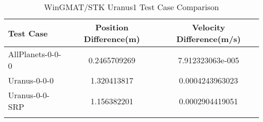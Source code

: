 \begin{table}[htbp!]
\centering
\caption{ WinGMAT/STK Uranus1 Test Case Comparison}
      \begin{tabular}{lcc}
      \hline\hline
          Test Case & Position Difference(m) & Velocity Difference(m/s) \\
         \hline
         AllPlanets-0-0-0 & 0.2465709269 & 7.912323063e-005 \\
         Uranus-0-0-0 & 1.320413817 & 0.0004243963023 \\
         Uranus-0-0-SRP & 1.156382201 & 0.0002904419051 \\
      \hline\hline
      \label{Table: Uranus1 WinGMAT-STK Table} 
\end{tabular}
\end{table}

